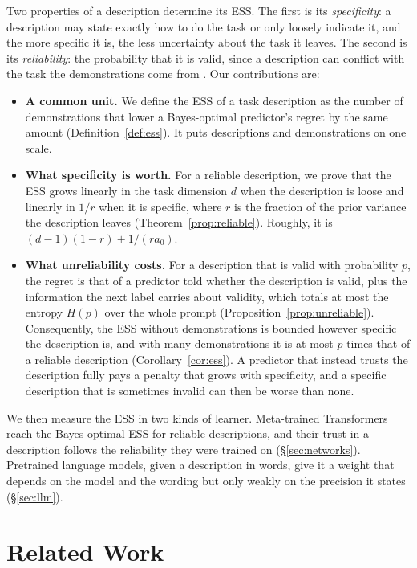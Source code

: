 \documentclass[10pt]{article}
\begin{document}
Two properties of a description determine its ESS. The first is its \emph{specificity}: a description may state exactly how to do the task or only loosely indicate it, and the more specific it is, the less uncertainty about the task it leaves. The second is its \emph{reliability}: the probability that it is valid, since a description can conflict with the task the demonstrations come from \citep{evans2006}. Our contributions are:
\begin{itemize}
    \item \textbf{A common unit.} We define the ESS of a task description as the number of demonstrations that lower a Bayes-optimal predictor's regret by the same amount (Definition~\ref{def:ess}). It puts descriptions and demonstrations on one scale.
    \item \textbf{What specificity is worth.} For a reliable description, we prove that the ESS grows linearly in the task dimension $d$ when the description is loose and linearly in $1/r$ when it is specific, where $r$ is the fraction of the prior variance the description leaves (Theorem~\ref{prop:reliable}). Roughly, it is $(d-1)(1-r) + 1/(r a_0)$.
    \item \textbf{What unreliability costs.} For a description that is valid with probability $p$, the regret is that of a predictor told whether the description is valid, plus the information the next label carries about validity, which totals at most the entropy $H(p)$ over the whole prompt (Proposition~\ref{prop:unreliable}). Consequently, the ESS without demonstrations is bounded however specific the description is, and with many demonstrations it is at most $p$ times that of a reliable description (Corollary~\ref{cor:ess}). A predictor that instead trusts the description fully pays a penalty that grows with specificity, and a specific description that is sometimes invalid can then be worse than none.
\end{itemize}
We then measure the ESS in two kinds of learner. Meta-trained Transformers reach the Bayes-optimal ESS for reliable descriptions, and their trust in a description follows the reliability they were trained on (\S\ref{sec:networks}). Pretrained language models, given a description in words, give it a weight that depends on the model and the wording but only weakly on the precision it states (\S\ref{sec:llm}).

\section{Related Work}
\end{document}
